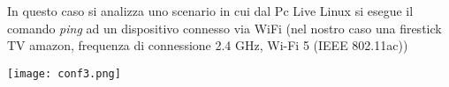 \documentclass[../lab2.tex]{subfiles}
\begin{document}
    In questo caso si analizza uno scenario in cui dal Pc Live Linux si esegue il comando \textit{ping} 
    ad un dispositivo connesso via WiFi (nel nostro caso una firestick TV amazon, 
    frequenza di connessione 2.4 GHz, Wi-Fi 5 (IEEE 802.11ac))

    \begin{center}
        \texttt{[image: conf3.png]}
    \end{center}
\end{document}
